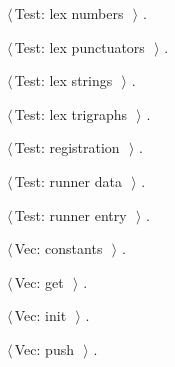 \documentclass[11pt,a4paper,twoside,openright,DIV=15]{scrbook}
\theoremstyle{definition}
\theoremstyle{plain}
\theoremstyle{remark}
\begin{document}
{\begin{list}{}{\setlength{\itemsep}{-\parsep}\setlength{\itemindent}{-\leftmargin}}
\item $\langle\,$Test: lex numbers\nobreak\ {\footnotesize {}}$\,\rangle$ {\footnotesize {\NWtxtRefIn} .}
\item $\langle\,$Test: lex punctuators\nobreak\ {\footnotesize {}}$\,\rangle$ {\footnotesize {\NWtxtRefIn} .}
\item $\langle\,$Test: lex strings\nobreak\ {\footnotesize {}}$\,\rangle$ {\footnotesize {\NWtxtRefIn} .}
\item $\langle\,$Test: lex trigraphs\nobreak\ {\footnotesize {}}$\,\rangle$ {\footnotesize {\NWtxtRefIn} .}
\item $\langle\,$Test: registration\nobreak\ {\footnotesize {}}$\,\rangle$ {\footnotesize {\NWtxtRefIn} .}
\item $\langle\,$Test: runner data\nobreak\ {\footnotesize {}}$\,\rangle$ {\footnotesize {\NWtxtRefIn} .}
\item $\langle\,$Test: runner entry\nobreak\ {\footnotesize {}}$\,\rangle$ {\footnotesize {\NWtxtRefIn} .}
\item $\langle\,$Vec: constants\nobreak\ {\footnotesize {}}$\,\rangle$ {\footnotesize {\NWtxtRefIn} .}
\item $\langle\,$Vec: get\nobreak\ {\footnotesize {}}$\,\rangle$ {\footnotesize {\NWtxtRefIn} .}
\item $\langle\,$Vec: init\nobreak\ {\footnotesize {}}$\,\rangle$ {\footnotesize {\NWtxtRefIn} .}
\item $\langle\,$Vec: push\nobreak\ {\footnotesize {}}$\,\rangle$ {\footnotesize {\NWtxtRefIn} .}
\end{list}}
\end{document}
